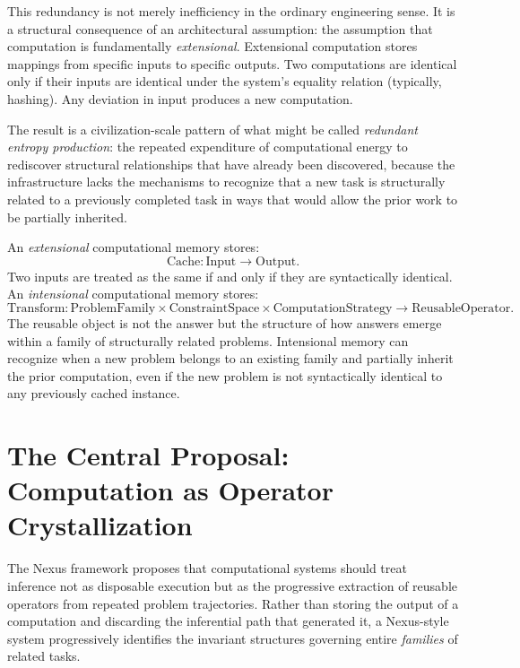 This redundancy is not merely inefficiency in the ordinary
engineering sense. It is a structural consequence of an
architectural assumption: the assumption that computation
is fundamentally \emph{extensional}. Extensional computation
stores mappings from specific inputs to specific outputs.
Two computations are identical only if their inputs are
identical under the system's equality relation (typically,
hashing). Any deviation in input produces a new computation.

The result is a civilization-scale pattern of what might
be called \emph{redundant entropy production}: the repeated
expenditure of computational energy to rediscover structural
relationships that have already been discovered, because
the infrastructure lacks the mechanisms to recognize that
a new task is structurally related to a previously completed
task in ways that would allow the prior work to be partially
inherited.

\begin{technote}
An \emph{extensional} computational memory stores:
\[
  \text{Cache} : \text{Input} \to \text{Output}.
\]
Two inputs are treated as the same if and only if they
are syntactically identical. An \emph{intensional}
computational memory stores:
\[
  \text{Transform} : \text{ProblemFamily}
  \times \text{ConstraintSpace}
  \times \text{ComputationStrategy}
  \to \text{ReusableOperator}.
\]
The reusable object is not the answer but the structure
of how answers emerge within a family of structurally
related problems. Intensional memory can recognize when
a new problem belongs to an existing family and partially
inherit the prior computation, even if the new problem
is not syntactically identical to any previously cached
instance.
\end{technote}

\section{The Central Proposal: Computation as Operator Crystallization}
\label{sec:operator-crystallization}

The Nexus framework proposes that computational systems
should treat inference not as disposable execution but
as the progressive extraction of reusable operators from
repeated problem trajectories. Rather than storing the
output of a computation and discarding the inferential
path that generated it, a Nexus-style system progressively
identifies the invariant structures governing entire
\emph{families} of related tasks.

